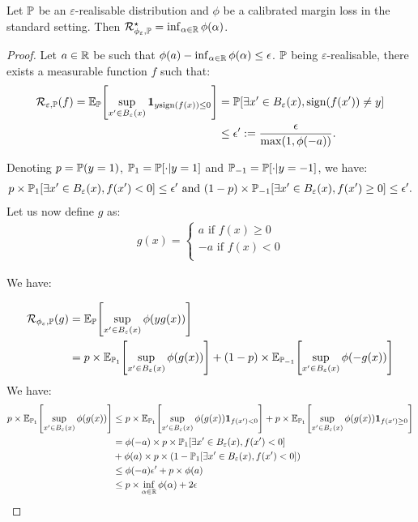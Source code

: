 \begin{lemma}
    \label{lemma:realisable}
    Let $\mathbb{P}$ be an $\varepsilon$-realisable distribution and $\phi$ be a calibrated margin loss in the standard setting. Then $\mathcal{R}^\star_{\phi_\varepsilon,\mathbb{P}}=\inf_{\alpha\in\mathbb{R}}\phi(\alpha)$.
    \end{lemma}
\begin{proof}
Let $a\in\mathbb{R}$ be such that $\phi(a)-\inf_{\alpha\in\mathbb{R}} \phi(\alpha) \leq \epsilon$. $\mathbb{P}$ being $\varepsilon$-realisable, there exists a measurable function $f$ such that:
\begin{align*}
    \risk_{\varepsilon,\PP}(f) = \mathbb{E}_\PP\left[\sup_{x'\in B_\varepsilon(x)} \mathbf{1}_{y\text{sign}(f(x))\leq 0}\right] &=  \PP\left[\exists x'\in B_\varepsilon(x), \text{sign}(f(x'))\neq y\right]\\
    &\leq \epsilon':= \frac{\epsilon}{\max(1,\phi(-a))}.\\
\end{align*}

Denoting $p =\mathbb{P}(y=1)$, $\mathbb{P}_1 = \mathbb{P}[\cdot|y=1]$ and $\mathbb{P}_{-1} = \mathbb{P}[\cdot|y=-1]$, we have:
\begin{align*}
        p\times\PP_1\left[\exists x'\in B_\varepsilon(x), f(x')<0\right]\leq \epsilon'\text{ and }
                (1-p)\times\PP_{-1}\left[\exists x'\in B_\varepsilon(x), f(x')\geq0\right]\leq \epsilon'.
\end{align*}
Let us now define $g$ as:
\begin{align*}
        g(x)= \left\{
    \begin{array}{ll}
    a\text{ if } f(x)\geq 0\\
    -a\text{ if } f(x)< 0\\
    \end{array}
    \right.
\end{align*}

We have:

\begin{align*}
\risk_{\phi_\varepsilon,\PP}(g) &= \EE_\PP\left[\sup_{x'\in B_\varepsilon(x)}\phi(yg(x))\right]\\
&=p\times\EE_{\PP_1}\left[\sup_{x'\in B_\varepsilon(x)}\phi(g(x))\right] +(1-p)\times\EE_{\PP_{-1}}\left[\sup_{x'\in B_\varepsilon(x)}\phi(-g(x))\right]
\end{align*}
We have:
\begin{align*}
    p\times\EE_{\PP_1}\left[\sup_{x'\in B_\varepsilon(x)}\phi(g(x))\right]&\leq p\times\EE_{\PP_1}\left[\sup_{x'\in B_\varepsilon(x)}\phi(g(x))\mathbf{1}_{f(x')<0}\right]+p\times\EE_{\PP_1}\left[\sup_{x'\in B_\varepsilon(x)}\phi(g(x))\mathbf{1}_{f(x')\geq 0}\right] \\
    &=\phi(-a)\times p\times \PP_1\left[\exists x'\in B_\varepsilon(x), f(x')<0\right] \\
    &+ \phi(a)\times p\times\left(1- \PP_1\left[\exists x'\in B_\varepsilon(x), f(x')<0\right]\right)\\
    &\leq\phi(-a) \epsilon'+p\times\phi(a)\\
    &\leq p\times\inf_{\alpha\in\RR}\phi(\alpha) + 2\epsilon
\end{align*}


\end{proof}
